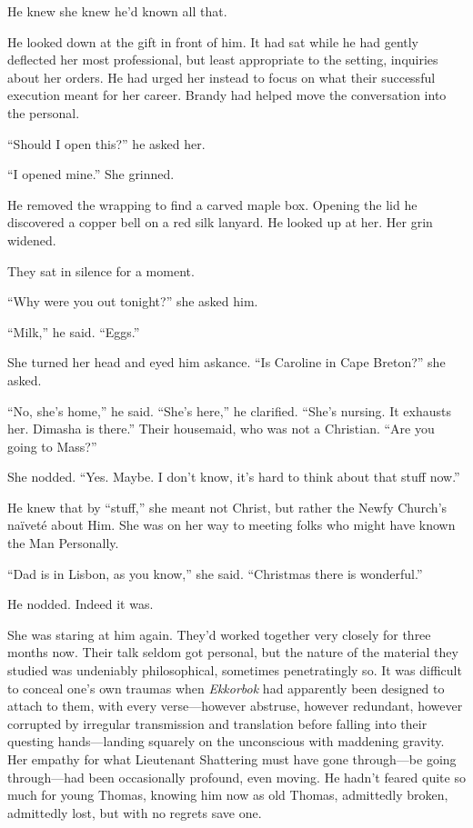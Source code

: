 \documentclass[11pt,a5paper]{article}
\begin{document}
He knew she knew he'd known all that.

He looked down at the gift in front of him. It had sat while he had gently deflected her most professional, but least appropriate to the setting, inquiries about her orders. He had urged her instead to focus on what their successful execution meant for her career. Brandy had helped move the conversation into the personal.

``Should I open this?'' he asked her.

``I opened mine.'' She grinned.

He removed the wrapping to find a carved maple box. Opening the lid he discovered a copper bell on a red silk lanyard. He looked up at her. Her grin widened.

They sat in silence for a moment.

``Why were you out tonight?'' she asked him.

``Milk,'' he said. ``Eggs.''

She turned her head and eyed him askance. ``Is Caroline in Cape Breton?'' she asked.

``No, she's home,'' he said. ``She's here,'' he clarified. ``She's nursing. It exhausts her. Dimasha is there.'' Their housemaid, who was not a Christian. ``Are you going to Mass?''

She nodded. ``Yes. Maybe. I don't know, it's hard to think about that stuff now.''

He knew that by ``stuff,'' she meant not Christ, but rather the Newfy Church's naïveté about Him. She was on her way to meeting folks who might have known the Man Personally.

``Dad is in Lisbon, as you know,'' she said. ``Christmas there is wonderful.''

He nodded. Indeed it was.

She was staring at him again. They'd worked together very closely for three months now. Their talk seldom got personal, but the nature of the material they studied was undeniably philosophical, sometimes penetratingly so. It was difficult to conceal one's own traumas when \emph{Ekkorbok} had apparently been designed to attach to them, with every verse---however abstruse, however redundant, however corrupted by irregular transmission and translation before falling into their questing hands---landing squarely on the unconscious with maddening gravity. Her empathy for what Lieutenant Shattering must have gone through---be going through---had been occasionally profound, even moving. He hadn't feared quite so much for young Thomas, knowing him now as old Thomas, admittedly broken, admittedly lost, but with no regrets save one.
\end{document}
